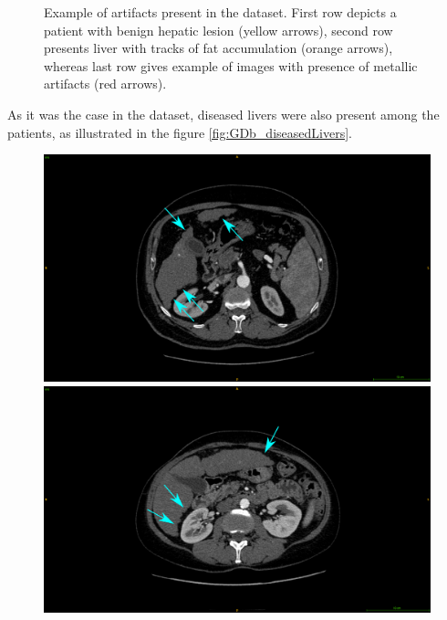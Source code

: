 {\begin{figure}[!ht]
\begin{mdframed}[backgroundcolor=blue!50,linecolor=blue!50]
\begin{minipage}{0.45\linewidth}
		\end{minipage}
	\end{mdframed}
	\caption{Example of artifacts present in the \textbf{} dataset. First row depicts a patient with benign hepatic lesion (yellow arrows), second row presents liver with tracks of fat accumulation (orange arrows), whereas last row gives example of images with presence of metallic artifacts (red arrows).}
	\label{fig:GDb_artifacts}
\end{figure}
As it was the case in the \textbf{} dataset, diseased livers were also present among the \textbf{} patients, as illustrated in the figure \ref{fig:GDb_diseasedLivers}.
\begin{figure}[!ht]
	\begin{mdframed}[backgroundcolor=blue!50,linecolor=blue!50]
		\centering
		\begin{minipage}{0.45\linewidth}
			\includegraphics[width=\linewidth]{images/GDB_cirrhoticPatientArrows}
		\end{minipage} \hspace{-0.1cm}
		\begin{minipage}{0.45\linewidth}
			\includegraphics[width=\linewidth]{images/GDB_cirrhoticPatientArrows_2}

\end{minipage}
\end{mdframed}
\end{figure}}
